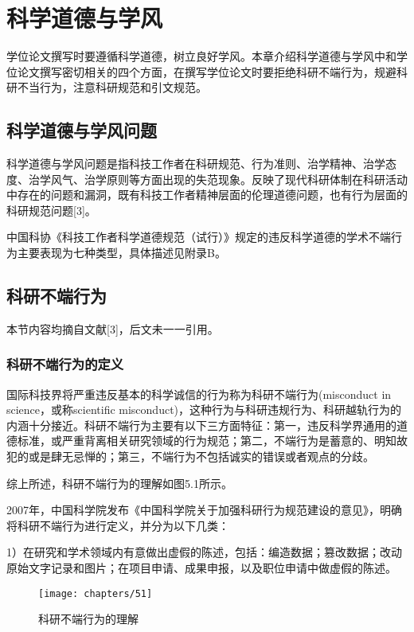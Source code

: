 \chapter{科学道德与学风}

学位论文撰写时要遵循科学道德，树立良好学风。本章介绍科学道德与学风中和学位论文撰写密切相关的四个方面，在撰写学位论文时要拒绝科研不端行为，规避科研不当行为，注意科研规范和引文规范。

\section{科学道德与学风问题}

科学道德与学风问题是指科技工作者在科研规范、行为准则、治学精神、治学态度、治学风气、治学原则等方面出现的失范现象。反映了现代科研体制在科研活动中存在的问题和漏洞，既有科技工作者精神层面的伦理道德问题，也有行为层面的科研规范问题[3]。

中国科协《科技工作者科学道德规范（试行）》规定的违反科学道德的学术不端行为主要表现为七种类型，具体描述见附录B。

\section{科研不端行为}

本节内容均摘自文献[3]，后文未一一引用。

\subsection{科研不端行为的定义}

国际科技界将严重违反基本的科学诚信的行为称为科研不端行为(misconduct in science，或称scientific misconduct)，这种行为与科研违规行为、科研越轨行为的内涵十分接近。科研不端行为主要有以下三方面特征：第一，违反科学界通用的道德标准，或严重背离相关研究领域的行为规范；第二，不端行为是蓄意的、明知故犯的或是肆无忌惮的；第三，不端行为不包括诚实的错误或者观点的分歧。

综上所述，科研不端行为的理解如图5.1所示。

2007年，中国科学院发布《中国科学院关于加强科研行为规范建设的意见》，明确将科研不端行为进行定义，并分为以下几类：

1）在研究和学术领域内有意做出虚假的陈述，包括：编造数据；篡改数据；改动原始文字记录和图片；在项目申请、成果申报，以及职位申请中做虚假的陈述。

\begin{figure} 
	\centering
	\begin{minipage}[t]{1\linewidth} 
		\centering 
		\texttt{[image: chapters/51]}
		\caption{科研不端行为的理解} 
		\label{fig:5.1} 
	\end{minipage}%
\end{figure}

